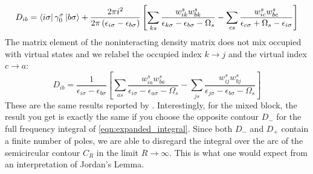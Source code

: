 \documentclass[12pt]{caltech_thesis}
\begin{document}
\begin{equation}
D_{ib} = \bra{i\sigma } \gamma _0^\sigma \ket{b\sigma } + \frac{2\pi i^2}{2\pi\left( \epsilon _{i\sigma } - \epsilon _{b\sigma } \right)} \left[ \sum_{ks} \frac{w_{ik}^s w_{bk}^s}{\epsilon _{k\sigma } - \epsilon _{b\sigma } - \Omega _s} - \sum_{cs} \frac{w_{ic}^s w_{bc}^s}{\epsilon _{c \sigma} + \Omega _s - \epsilon _{i\sigma}} \right]
\end{equation}
The matrix element of the noninteracting density matrix does not mix occupied with virtual states and we relabel the occupied index $k\rightarrow j$ and the virtual index $c\rightarrow a$:
\begin{equation}
D_{ib} = \frac{1}{\epsilon _{i\sigma } - \epsilon _{b\sigma }} \left[ \sum_{as} \frac{w_{ia}^s w_{ba}^s}{\epsilon _{i\sigma } - \epsilon _{a\sigma } - \Omega _s} - \sum_{js} \frac{w_{ij}^s w_{bj}^s}{\epsilon _{j\sigma } - \epsilon _{b\sigma } - \Omega _s} \right]
\end{equation}
These are the same results reported by \textcite{bruneval_assessment_2019}. Interestingly, for the mixed block, the result you get is exactly the same if you choose the opposite contour $D_-$ for the full frequency integral of \ref{eqn:expanded_integral}. Since both $D_-$ and $D_+$ contain a finite number of poles, we are able to disregard the integral over the arc of the semicircular contour $C_R$ in the limit $R \to \infty$. This is what one would expect from an interpretation of Jordan's Lemma. 




\printindex

\theendnotes

\end{document}
